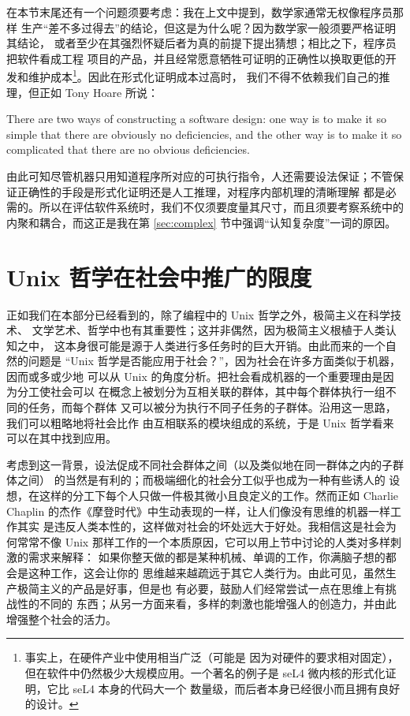 在本节末尾还有一个问题须要考虑：我在上文中提到，数学家通常无权像程序员那样
生产“差不多过得去”的结论，但这是为什么呢？因为数学家一般须要严格证明其结论，
或者至少在其强烈怀疑后者为真的前提下提出猜想；相比之下，程序员把软件看成工程
项目的产品，并且经常愿意牺牲可证明的正确性以换取更低的开发和维护成本\footnote%
{\label{fn:formal}事实上，在硬件产业中使用相当广泛（可能是
因为对硬件的要求相对固定），但在软件中仍然极少大规模应用。一个著名的例子是
seL4 微内核的形式化证明，它比 seL4 本身的代码大一个
数量级，而后者本身已经很小而且拥有良好的设计。}。因此在形式化证明成本过高时，
我们不得不依赖我们自己的推理，但正如 Tony Hoare 所说：
\begin{quoting}
	There are two ways of constructing a software design: one way is to make
	it so simple that there are obviously no deficiencies, and the other way
	is to make it so complicated that there are no obvious deficiencies.
\end{quoting}
由此可知尽管机器只用知道程序所对应的可执行指令，人还需要设法保证；不管保证正确性的手段是形式化证明还是人工推理，对程序内部机理的清晰理解
都是必需的。所以在评估软件系统时，我们不仅须要度量其尺寸，而且须要考察系统中的
内聚和耦合，而这正是我在第 \ref{sec:complex} 节中强调“认知复杂度”一词的原因。

\section{Unix 哲学在社会中推广的限度}\label{sec:society}

正如我们在本部分已经看到的，除了编程中的 Unix 哲学之外，极简主义在科学技术、
文学艺术、哲学中也有其重要性；这并非偶然，因为极简主义根植于人类认知之中，
这本身很可能是源于人类进行多任务时的巨大开销。由此而来的一个自然的问题是
“Unix 哲学是否能应用于社会？”，因为社会在许多方面类似于机器，因而或多或少地
可以从 Unix 的角度分析。把社会看成机器的一个重要理由是因为分工使社会可以
在概念上被划分为互相关联的群体，其中每个群体执行一组不同的任务，而每个群体
又可以被分为执行不同子任务的子群体。沿用这一思路，我们可以粗略地将社会比作
由互相联系的模块组成的系统，于是 Unix 哲学看来可以在其中找到应用。

考虑到这一背景，设法促成不同社会群体之间（以及类似地在同一群体之内的子群体之间）
的当然是有利的；而极端细化的社会分工似乎也成为一种有些诱人的
设想，在这样的分工下每个人只做一件极其微小且良定义的工作。然而正如 Charlie
Chaplin 的杰作《摩登时代》中生动表现的一样，让人们像没有思维的机器一样工作其实
是违反人类本性的，这样做对社会的坏处远大于好处。我相信这是社会为何常常不像
Unix 那样工作的一个本质原因，它可以用上节中讨论的人类对多样刺激的需求来解释：
如果你整天做的都是某种机械、单调的工作，你满脑子想的都会是这种工作，这会让你的
思维越来越疏远于其它人类行为。由此可见，虽然生产极简主义的产品是好事，但是也
有必要，鼓励人们经常尝试一点在思维上有挑战性的不同的
东西；从另一方面来看，多样的刺激也能增强人的创造力，并由此增强整个社会的活力。

